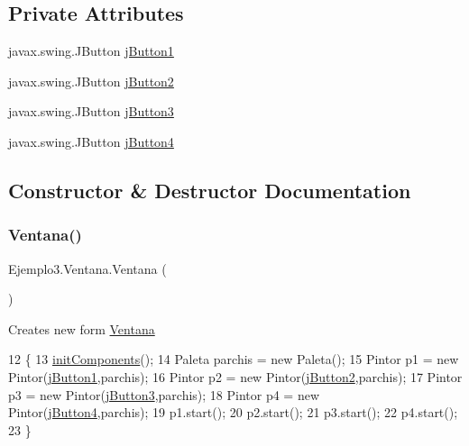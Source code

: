 \subsection*{Private Attributes}
\begin{DoxyCompactItemize}
\item 
javax.\+swing.\+J\+Button \mbox{\hyperlink{class_ejemplo3_1_1_ventana_a9c9557e7e1d01b6a2c59303420a82960}{j\+Button1}}
\item 
javax.\+swing.\+J\+Button \mbox{\hyperlink{class_ejemplo3_1_1_ventana_a57fb2c553f7b9dfe7b817d42e931d02d}{j\+Button2}}
\item 
javax.\+swing.\+J\+Button \mbox{\hyperlink{class_ejemplo3_1_1_ventana_ad5cc36db674ee054410bb5d33de59124}{j\+Button3}}
\item 
javax.\+swing.\+J\+Button \mbox{\hyperlink{class_ejemplo3_1_1_ventana_a22a478dbd87be7d99b7972cf00dbbf26}{j\+Button4}}
\end{DoxyCompactItemize}


\subsection{Constructor \& Destructor Documentation}
\mbox{\label{class_ejemplo3_1_1_ventana_a3f6d615323f128823ee69f37072074be}} 
\subsubsection{\texorpdfstring{Ventana()}{Ventana()}}
{\footnotesize\ttfamily Ejemplo3.\+Ventana.\+Ventana (\begin{DoxyParamCaption}{ }\end{DoxyParamCaption})\hspace{0.3cm}{\ttfamily [inline]}}

Creates new form \mbox{\hyperlink{class_ejemplo3_1_1_ventana}{Ventana}} 
\begin{DoxyCode}
12     \{
13         \mbox{\hyperlink{class_ejemplo3_1_1_ventana_a11ba26ba1137e0103d7bae3b3aa3fec7}{initComponents}}();
14         Paleta parchis = \textcolor{keyword}{new} Paleta();
15         Pintor p1 = \textcolor{keyword}{new} Pintor(\mbox{\hyperlink{class_ejemplo3_1_1_ventana_a9c9557e7e1d01b6a2c59303420a82960}{jButton1}},parchis);
16         Pintor p2 = \textcolor{keyword}{new} Pintor(\mbox{\hyperlink{class_ejemplo3_1_1_ventana_a57fb2c553f7b9dfe7b817d42e931d02d}{jButton2}},parchis);
17         Pintor p3 = \textcolor{keyword}{new} Pintor(\mbox{\hyperlink{class_ejemplo3_1_1_ventana_ad5cc36db674ee054410bb5d33de59124}{jButton3}},parchis);
18         Pintor p4 = \textcolor{keyword}{new} Pintor(\mbox{\hyperlink{class_ejemplo3_1_1_ventana_a22a478dbd87be7d99b7972cf00dbbf26}{jButton4}},parchis);
19         p1.start();
20         p2.start();
21         p3.start();
22         p4.start();
23     \}
\end{DoxyCode}


